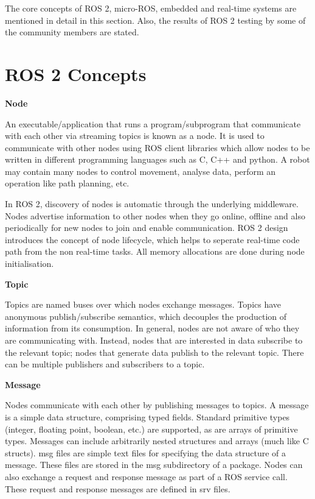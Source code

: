 \documentclass[%
xelatex,
	oneside,		%
	12pt,			%
	parskip=half,	%
	abstracton,
	chapterprefix=true%
    appendixprefix=true]
{scrbook}
\begin{document}
The core concepts of ROS 2, micro-ROS, embedded and real-time systems are mentioned in detail in this section. Also, the results of ROS 2 testing by some of the community members are stated.
	\section{ROS 2 Concepts}
	
	\vspace*{0.5cm}
	{\bfseries Node}
	
	
	\vspace*{0.5cm}
An executable/application that runs a program/subprogram that communicate with each other via streaming topics is known as a node.
It is used to communicate with other nodes using ROS client libraries which allow nodes to be written in different programming languages such as C, C++ and python. A robot may contain many nodes to control movement, analyse data, perform an operation like path planning, etc. 

In ROS 2, discovery of nodes is automatic through the underlying middleware. Nodes advertise information to other nodes when they go online, offline and also periodically for new nodes to join and enable communication. ROS 2 design introduces the concept of node lifecycle, which helps to seperate real-time code path from the non real-time tasks. All memory allocations are done during node initialisation.


\vspace*{0.5cm}
	{\bfseries Topic}
	
	
	\vspace*{0.5cm}
	Topics are named buses over which nodes exchange messages. Topics have anonymous publish/subscribe semantics, which decouples the production of information from its consumption. In general, nodes are not aware of who they are communicating with. Instead, nodes that are interested in data subscribe to the relevant topic; nodes that generate data publish to the relevant topic. There can be multiple publishers and subscribers to a topic.\cite{topic}
	
	\vspace*{0.5cm}
	{\bfseries Message}
	
	
	\vspace*{0.5cm}
	Nodes communicate with each other by publishing messages to topics. A message is a simple data structure, comprising typed fields. Standard primitive types (integer, floating point, boolean, etc.) are supported, as are arrays of primitive types. Messages can include arbitrarily nested structures and arrays (much like C structs). msg files are simple text files for specifying the data structure of a message. These files are stored in the msg subdirectory of a package. Nodes can also exchange a request and response message as part of a ROS service call. These request and response messages are defined in srv files.\cite{messages}
	
\end{document}
